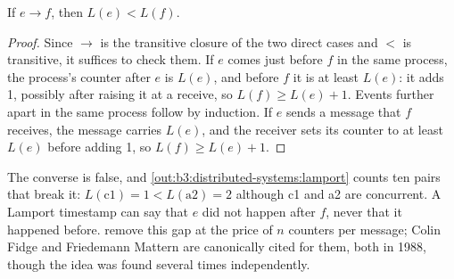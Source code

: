 \begin{omfigure}
\par{}
\end{omfigure}

\begin{theorem}\label{thm:b3:distributed-systems:clock-condition}
If $e \to f$, then $L(e) < L(f)$.
\end{theorem}

\begin{proof}
Since $\to$ is the transitive closure of the two direct cases and $<$ is transitive, it suffices to check them. If $e$ comes just before $f$ in the same process, the process's counter after $e$ is $L(e)$, and before $f$ it is at least $L(e)$: it adds 1, possibly after raising it at a receive, so $L(f) \ge L(e) + 1$. Events further apart in the same process follow by induction. If $e$ sends a message that $f$ receives, the message carries $L(e)$, and the receiver sets its counter to at least $L(e)$ before adding 1, so $L(f) \ge L(e) + 1$.
\end{proof}

The converse is false, and \cref{out:b3:distributed-systems:lamport} counts ten pairs that break it: $L(\mathrm{c1}) = 1 < L(\mathrm{a2}) = 2$ although c1 and a2 are concurrent. A Lamport timestamp can say that $e$ did not happen after $f$, never that it happened before.  remove this gap at the price of $n$ counters per message; Colin Fidge and Friedemann Mattern are canonically cited for them, both in 1988, though the idea was found several times independently. %

